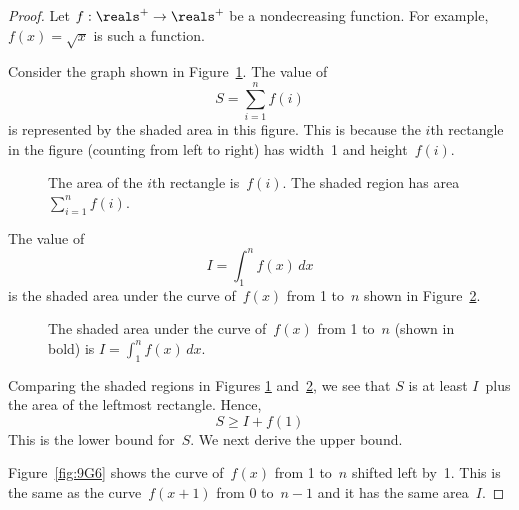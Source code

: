 \begin{proof}
Let $f: \reals^+ \to \reals^+$  be a nondecreasing function.  For
example, $f(x) = \sqrt{x}$ is such a function.

Consider the graph shown in Figure~\ref{fig:9G4}.  The value of
\begin{equation*}
    S = \sum_{i = 1}^n f(i)
\end{equation*}
is represented by the shaded area in this figure.  This is because the
$i$th rectangle in the figure (counting from left to right) has
width~1 and height~$f(i)$.

\begin{figure}



\caption{The area of the $i$th rectangle is~$f(i)$.  The shaded region
has area $\sum_{i = 1}^n f(i)$.}

\label{fig:9G4}

\end{figure}

The value of
\begin{equation*}
    I = \int_1^n f(x) \, dx
\end{equation*}
is the shaded area under the curve of~$f(x)$ from 1 to~$n$ shown in
Figure~\ref{fig:9G5}.

\begin{figure}



\caption{The shaded area under the curve of~$f(x)$ from 1 to~$n$
  (shown in bold) is $I = \int_1^n f(x)\, dx$.}

\label{fig:9G5}

\end{figure}

Comparing the shaded regions in Figures \ref{fig:9G4}
and~\ref{fig:9G5}, we see that $S$ is at least $I$~plus the area of
the leftmost rectangle.  Hence,
\begin{equation}\label{eqn:9G7}
    S \ge I + f(1)
\end{equation}
This is the lower bound for~$S$.  We next derive the upper bound.

Figure~\ref{fig:9G6} shows the curve of~$f(x)$ from 1 to~$n$ shifted
left by~1.  This is the same as the curve~$f(x + 1)$ from 0 to~$n - 1$
and it has the same area~$I$.


\end{proof}
